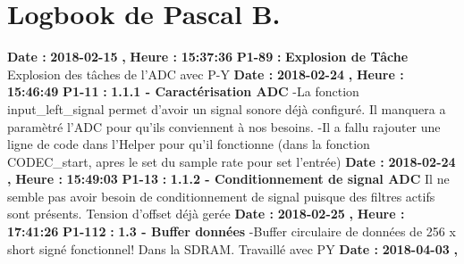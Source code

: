 \documentclass{article}%
\begin{document}
%
\section{Logbook de Pascal B.}%
\textbf{Date : }%
\textbf{2018{-}02{-}15}%
\textbf{,}%
\textbf{ Heure : }%
\textbf{15:37:36}%
\newline%
%
\textbf{P1{-}89 }%
\textbf{ : }%
\textbf{ Explosion de Tâche}%
\newline%
\newline%
%
Explosion des tâches de l'ADC avec P{-}Y\newline%
\newline%
%
\textbf{Date : }%
\textbf{2018{-}02{-}24}%
\textbf{,}%
\textbf{ Heure : }%
\textbf{15:46:49}%
\newline%
%
\textbf{P1{-}11 }%
\textbf{ : }%
\textbf{ 1.1.1 {-} Caractérisation ADC}%
\newline%
\newline%
%
{-}La fonction input\_left\_signal permet d'avoir un signal sonore déjà configuré. Il manquera a paramètré l'ADC pour qu'ils conviennent à nos besoins.\newline%
{-}Il a fallu rajouter une ligne de code dans l'Helper pour qu'il fonctionne (dans la fonction CODEC\_start, apres le set du sample rate pour set l'entrée)\newline%
\newline%
%
\textbf{Date : }%
\textbf{2018{-}02{-}24}%
\textbf{,}%
\textbf{ Heure : }%
\textbf{15:49:03}%
\newline%
%
\textbf{P1{-}13 }%
\textbf{ : }%
\textbf{ 1.1.2 {-} Conditionnement de signal ADC}%
\newline%
\newline%
%
Il ne semble pas avoir besoin de conditionnement de signal puisque des filtres actifs sont présents.\newline%
Tension d'offset déjà gerée\newline%
\newline%
%
\textbf{Date : }%
\textbf{2018{-}02{-}25}%
\textbf{,}%
\textbf{ Heure : }%
\textbf{17:41:26}%
\newline%
%
\textbf{P1{-}112 }%
\textbf{ : }%
\textbf{ 1.3 {-} Buffer données}%
\newline%
\newline%
%
{-}Buffer circulaire de données de 256 x short signé fonctionnel! Dans la SDRAM. Travaillé avec PY\newline%
\newline%
%
\textbf{Date : }%
\textbf{2018{-}04{-}03}%
\textbf{,}%
\end{document}
